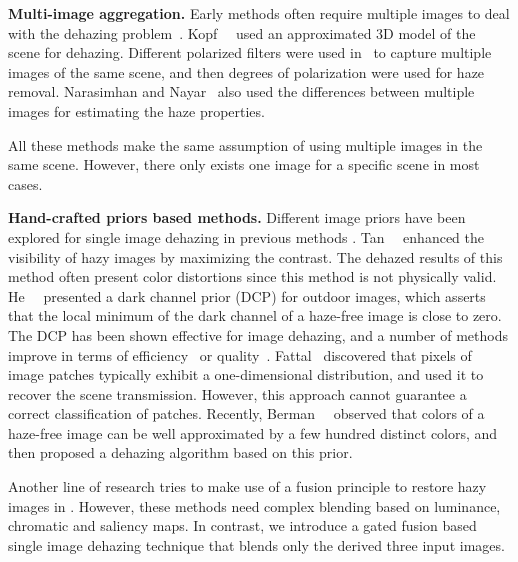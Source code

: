 \documentclass[10pt,twocolumn,letterpaper]{article}
\begin{document}
\vspace{-3mm}
{\flushleft \textbf{Multi-image aggregation.}}
Early methods often require
multiple images to deal with the dehazing problem~\cite{narasimhan2003contrast,kopf2008deep,treibitz2009polarization}.
Kopf~\etal~\cite{kopf2008deep} used an approximated 3D model of the scene for dehazing.
Different polarized filters were used in~\cite{treibitz2009polarization} to capture multiple images of the same scene, and then degrees of polarization were used for haze removal.
Narasimhan and Nayar~\cite{narasimhan2003contrast}
also used the differences between multiple images for estimating the haze properties.


All these methods make
the same assumption of using multiple images in the same
scene. However, there only exists one image
for a specific scene in most cases.


\vspace{-2mm}
{\flushleft \textbf{Hand-crafted priors based methods.}}
Different image priors have been explored for single image dehazing in previous methods \cite{li2015nighttime}.
Tan~\etal~\cite{tan2008visibility} enhanced the visibility of hazy images by maximizing the contrast. The dehazed results
of this method often present color distortions since this
method is not physically valid.
He~\etal~\cite{he2011singlecvpr} presented a dark channel prior (DCP) for outdoor images, which asserts that the local minimum of the dark channel of a haze-free image is close to zero.
The DCP has been shown effective for
image dehazing, and a number of methods improve \cite{he2011singlecvpr} in terms of efficiency~\cite{tarel2009fast} or quality~\cite{nishino2012bayesian}.
Fattal~\cite{fattal2014dehazing} discovered that pixels of image patches typically exhibit a one-dimensional distribution, and used it to recover the scene transmission. However, this approach cannot guarantee a correct classification of patches.
Recently, Berman~\etal~\cite{berman2016non} observed that colors of a haze-free image can be well approximated by a few hundred distinct colors, and then proposed a dehazing algorithm based on this prior.

Another line of research tries to make use of a fusion principle to restore hazy images in \cite{ancuti2013single,choi2015referenceless}. However, these methods need complex blending based on luminance, chromatic and saliency maps.
In contrast, we introduce a gated fusion based single image dehazing technique that blends only the derived three input images.
\end{document}
